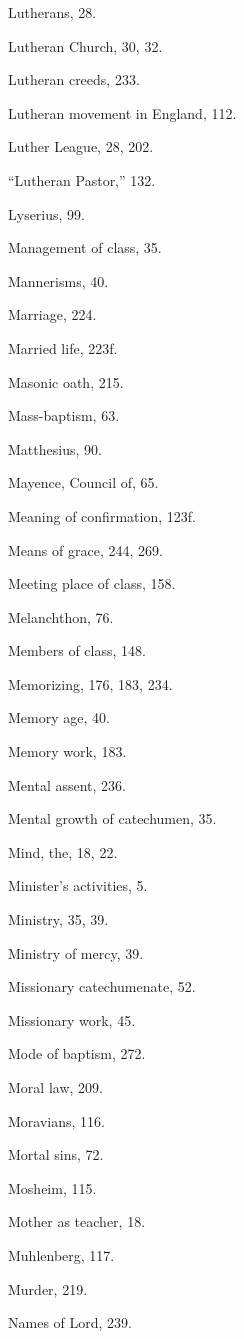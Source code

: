 \begin{originalinhalt}
Lutherans, 28.

Lutheran Church, 30, 32.

Lutheran creeds, 233.

Lutheran movement in England, 112.

Luther League, 28, 202.

“Lutheran Pastor,” 132.

Lyserius, 99.


Management of class, 35.

Mannerisms, 40.

Marriage, 224.

Married life, 223f.

Masonic oath, 215.

Mass-baptism, 63.

Matthesius, 90.

Mayence, Council of, 65.

Meaning of confirmation, 123f.

Means of grace, 244, 269.

Meeting place of class, 158.

Melanchthon, 76.

Members of class, 148.

Memorizing, 176, 183, 234.

Memory age, 40.

Memory work, 183.

Mental assent, 236.

Mental growth of catechumen, 35.

Mind, the, 18, 22.

Minister’s activities, 5.

Ministry, 35, 39.

Ministry of mercy, 39.

Missionary catechumenate, 52.

Missionary work, 45.

Mode of baptism, 272.

Moral law, 209.

Moravians, 116.

Mortal sins, 72.

Mosheim, 115.

Mother as teacher, 18.

Muhlenberg, 117.

Murder, 219.


Names of Lord, 239.


\end{originalinhalt}
